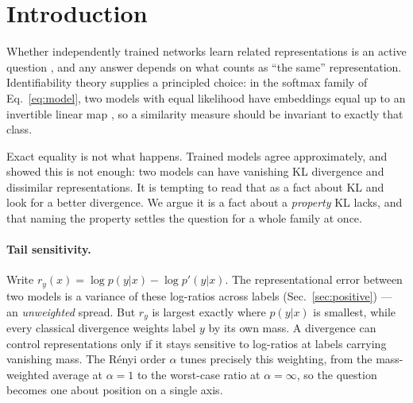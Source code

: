 \documentclass[10pt,letterpaper,twocolumn]{article}
\theoremstyle{plain}
\theoremstyle{definition}
\theoremstyle{remark}
\begin{document}
\section{Introduction}
\label{sec:intro}

Whether independently trained networks learn related representations is an
active question \citep{kornblith2019,klabunde2025}, and any answer depends on
what counts as ``the same'' representation. Identifiability theory supplies a
principled choice: in the softmax family of Eq.~\eqref{eq:model}, two models
with equal likelihood have embeddings equal up to an invertible linear map
\citep{roeder2021,khemakhem2020icebeem,lachapelle2023}, so a similarity measure
should be invariant to exactly that class.

Exact equality is not what happens. Trained models agree approximately, and
\citet{nielsen2025} showed this is not enough: two models can have vanishing
KL divergence and dissimilar representations. It is tempting to read that as a
fact about KL and look for a better divergence. We argue it is a fact about a
\emph{property} KL lacks, and that naming the property settles the question for
a whole family at once.

\paragraph{Tail sensitivity.}
Write $r_{y}(x)=\log p(y|x)-\log p'(y|x)$. The representational error between
two models is a variance of these log-ratios across labels
(Sec.~\ref{sec:positive}) --- an \emph{unweighted} spread. But $r_{y}$ is
largest exactly where $p(y|x)$ is smallest, while every classical divergence
weights label $y$ by its own mass. A divergence can control representations
only if it stays sensitive to log-ratios at labels carrying vanishing mass. The
R\'enyi order $\alpha$ tunes precisely this weighting, from the mass-weighted
average at $\alpha=1$ to the worst-case ratio at $\alpha=\infty$, so the
question becomes one about position on a single axis.
\end{document}
